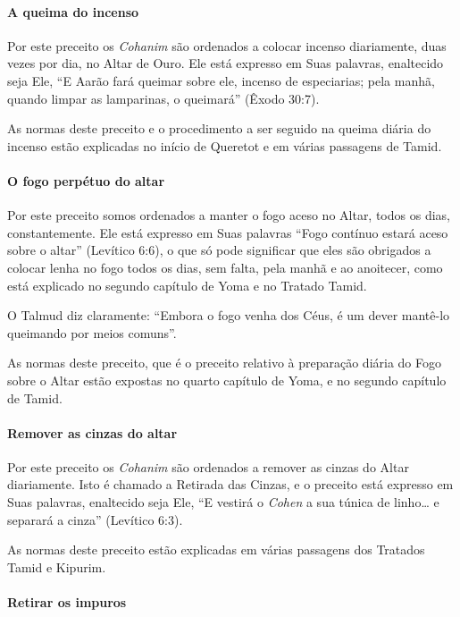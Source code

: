 \paragraph{A queima do incenso}

Por este preceito os \textit{Cohanim} são ordenados a colocar incenso
diariamente, duas vezes por dia, no Altar de Ouro. Ele está expresso em
Suas palavras, enaltecido seja Ele, ``E Aarão fará queimar sobre ele,
incenso de especiarias; pela manhã, quando limpar as lamparinas, o
queimará'' (Êxodo 30:7).

As normas deste preceito e o procedimento a ser seguido na queima diária
do incenso estão explicadas no início de Queretot e em várias passagens
de Tamid.

\paragraph{O fogo perpétuo do altar}

Por este preceito somos ordenados a manter o fogo aceso no Altar, todos
os dias, constantemente. Ele está expresso em Suas palavras ``Fogo
contínuo estará aceso sobre o altar'' (Levítico 6:6), o que só pode
significar que eles são obrigados a colocar lenha no fogo todos os dias,
sem falta, pela manhã e ao anoitecer, como está explicado no segundo
capítulo de Yoma e no Tratado Tamid.

O Talmud diz claramente: ``Embora o fogo venha dos Céus, é um dever
mantê-lo queimando por meios comuns''.

As normas deste preceito, que é o preceito relativo à preparação diária
do Fogo sobre o Altar estão expostas no quarto capítulo de Yoma, e no
segundo capítulo de Tamid.

\paragraph{Remover as cinzas do altar}

Por este preceito os \textit{Cohanim} são ordenados a remover as cinzas do
Altar diariamente. Isto é chamado a Retirada das Cinzas, e o preceito
está expresso em Suas palavras, enaltecido seja Ele, ``E vestirá o
\textit{Cohen} a sua túnica de linho\ldots{} e separará a cinza'' (Levítico 6:3).

As normas deste preceito estão explicadas em várias passagens dos
Tratados Tamid e Kipurim.

\paragraph{Retirar os impuros}

